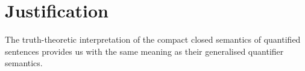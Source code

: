 \section{Justification}
\label{just}





\begin{proposition}
The truth-theoretic interpretation of the compact closed semantics of quantified sentences provides us with the same meaning as their generalised quantifier semantics.
\end{proposition}


